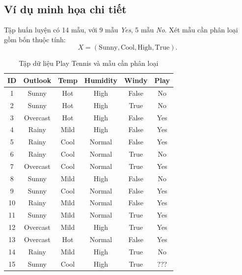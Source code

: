 \subsection{Ví dụ minh họa chi tiết}

Tập huấn luyện có 14 mẫu, với 9 mẫu \textit{Yes}, 5 mẫu \textit{No}.
Xét mẫu cần phân loại gồm bốn thuộc tính:
\[X=(\mathrm{Sunny},\mathrm{Cool},\mathrm{High},\mathrm{True}).\]
\begin{table}[H]
    \centering
    \small
    \renewcommand{\arraystretch}{1.15}
    \begin{tabular}{|c|c|c|c|c|c|}
        \hline
        \rowcolor{yellow}
        \textbf{ID} & \textbf{Outlook} & \textbf{Temp} & \textbf{Humidity} & \textbf{Windy} & \textbf{Play} \\
        \hline
        1 & Sunny & Hot & High & False & No \\
        \hline
        2 & Sunny & Hot & High & True & No \\
        \hline
        3 & Overcast & Hot & High & False & Yes \\
        \hline
        4 & Rainy & Mild & High & False & Yes \\
        \hline
        5 & Rainy & Cool & Normal & False & Yes \\
        \hline
        6 & Rainy & Cool & Normal & True & No \\
        \hline
        7 & Overcast & Cool & Normal & True & Yes \\
        \hline
        8 & Sunny & Mild & High & False & No \\
        \hline
        9 & Sunny & Cool & Normal & False & Yes \\
        \hline
        10 & Rainy & Mild & Normal & False & Yes \\
        \hline
        11 & Sunny & Mild & Normal & True & Yes \\
        \hline
        12 & Overcast & Mild & High & True & Yes \\
        \hline
        13 & Overcast & Hot & Normal & False & Yes \\
        \hline
        14 & Rainy & Mild & High & True & No \\
        \hline
        \rowcolor{yellow}
        15 & Sunny & Cool & High & True & ??? \\
        \hline
    \end{tabular}
    \caption{Tập dữ liệu Play Tennis và mẫu cần phân loại}
    \label{tab:naive-bayes-play-tennis}
\end{table}
